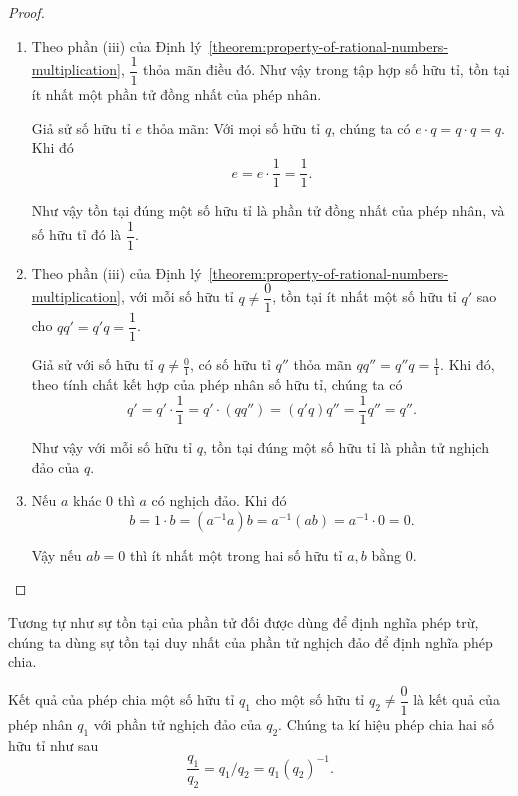 \begin{proof}
    \begin{enumerate}[label={(\roman*)}]
        \item Theo phần (iii) của Định lý~\ref{theorem:property-of-rational-numbers-multiplication}, $\dfrac{1}{1}$ thỏa mãn điều đó. Như vậy trong tập hợp số hữu tỉ, tồn tại ít nhất một phần tử đồng nhất của phép nhân.

              Giả sử số hữu tỉ $e$ thỏa mãn: Với mọi số hữu tỉ $q$, chúng ta có $e\cdot q = q\cdot q = q$. Khi đó
              \[
                  e = e\cdot\frac{1}{1} = \frac{1}{1}.
              \]

              Như vậy tồn tại đúng một số hữu tỉ là phần tử đồng nhất của phép nhân, và số hữu tỉ đó là $\dfrac{1}{1}$.
        \item Theo phần (iii) của Định lý~\ref{theorem:property-of-rational-numbers-multiplication}, với mỗi số hữu tỉ $q\ne \dfrac{0}{1}$, tồn tại ít nhất một số hữu tỉ $q'$ sao cho $qq' = q'q = \dfrac{1}{1}$.

              Giả sử với số hữu tỉ $q\ne \frac{0}{1}$, có số hữu tỉ $q''$ thỏa mãn $qq'' = q''q = \frac{1}{1}$. Khi đó, theo tính chất kết hợp của phép nhân số hữu tỉ, chúng ta có
              \[
                  q' = q'\cdot\frac{1}{1} = q'\cdot\left( qq'' \right) = (q'q)q'' = \frac{1}{1}q'' = q''.
              \]

              Như vậy với mỗi số hữu tỉ $q$, tồn tại đúng một số hữu tỉ là phần tử nghịch đảo của $q$.
        \item Nếu $a$ khác $0$ thì $a$ có nghịch đảo. Khi đó
              \[
                  b = 1\cdot b = (a^{-1}a)b = a^{-1}(ab) = a^{-1}\cdot 0 = 0.
              \]

              Vậy nếu $ab = 0$ thì ít nhất một trong hai số hữu tỉ $a, b$ bằng $0$.
    \end{enumerate}
\end{proof}

Tương tự như sự tồn tại của phần tử đối được dùng để định nghĩa phép trừ, chúng ta dùng sự tồn tại duy nhất của phần tử nghịch đảo để định nghĩa phép chia.
\begin{definition}
    Kết quả của phép chia một số hữu tỉ $q_{1}$ cho một số hữu tỉ $q_{2}\ne\dfrac{0}{1}$ là kết quả của phép nhân $q_{1}$ với phần tử nghịch đảo của $q_{2}$. Chúng ta kí hiệu phép chia hai số hữu tỉ như sau
    \[
        \frac{q_{1}}{q_{2}} = q_{1}/q_{2} = q_{1}{(q_{2})}^{-1}.
    \]
\end{definition}

